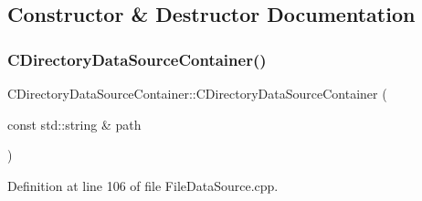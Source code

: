 \subsection{Constructor \& Destructor Documentation}
\hypertarget{classCDirectoryDataSourceContainer_a62ef6d44201c6be66421b6c247f3b3bf}{}\label{classCDirectoryDataSourceContainer_a62ef6d44201c6be66421b6c247f3b3bf} 
\subsubsection{\texorpdfstring{C\+Directory\+Data\+Source\+Container()}{CDirectoryDataSourceContainer()}}
{\footnotesize\ttfamily C\+Directory\+Data\+Source\+Container\+::\+C\+Directory\+Data\+Source\+Container (\begin{DoxyParamCaption}\item[{const std\+::string \&}]{path }\end{DoxyParamCaption})}



Definition at line 106 of file File\+Data\+Source.\+cpp.


